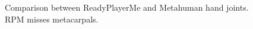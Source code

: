 \documentclass{uva-inf-article}
\begin{document}
\begin{figure}[hbt!]
    \centering
    \qquad
    \caption{Comparison between ReadyPlayerMe and Metahuman hand joints. RPM misses metacarpals.}%
    \label{fig:rpmvsmeta}%
\end{figure}
\end{document}
